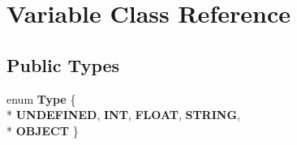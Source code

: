 \hypertarget{a00027}{\section{Variable Class Reference}
\label{a00027}
}
\subsection*{Public Types}
\begin{DoxyCompactItemize}
\item 
\hypertarget{a00027_a132ec67f164061bacffc204425dc1eb1}{enum {\bfseries Type} \{ \\*
{\bfseries U\+N\+D\+E\+F\+I\+N\+E\+D}, 
{\bfseries I\+N\+T}, 
{\bfseries F\+L\+O\+A\+T}, 
{\bfseries S\+T\+R\+I\+N\+G}, 
\\*
{\bfseries O\+B\+J\+E\+C\+T}
 \}}\label{a00027_a132ec67f164061bacffc204425dc1eb1}

\end{DoxyCompactItemize}
